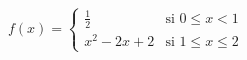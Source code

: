 \item $f(x) = \begin{cases} \frac{1}{2} & \text{si } 0 \le x < 1 \\ x^2 - 2x + 2 & \text{si } 1 \le x \le 2 \end{cases}$
